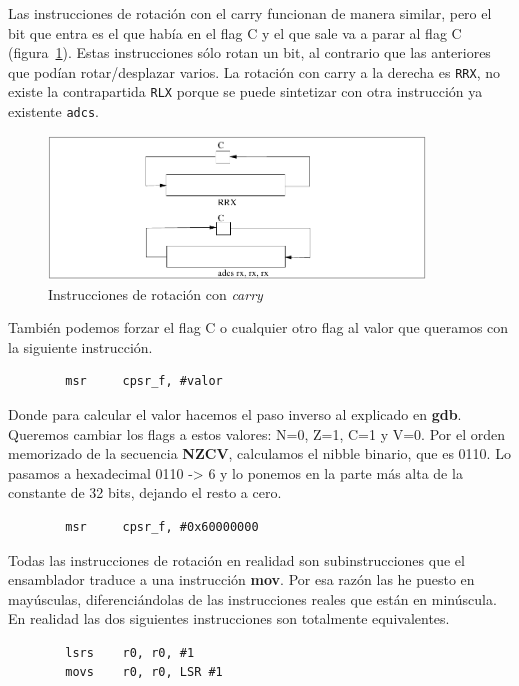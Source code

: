 Las instrucciones de rotación con el carry funcionan de manera
similar, pero el bit que entra es el que había en el flag C y el que sale va a
parar al flag C (figura~\ref{fig:instrRotCarry}). Estas instrucciones
sólo rotan un bit, al contrario que las anteriores que podían rotar/desplazar
varios. La rotación con carry a la derecha es {\tt RRX}, no existe la contrapartida
{\tt RLX} porque se puede sintetizar con otra instrucción ya existente {\tt adcs}.

\begin{figure}[h]
  \centering
    \includegraphics[width=10cm]{graphs/rrxadcs.pdf}
  \caption{Instrucciones de rotación con {\it carry}}
  \label{fig:instrRotCarry}
\end{figure}

También podemos forzar el flag C o cualquier otro flag al
valor que queramos con la siguiente instrucción.

\begin{lstlisting}
        msr     cpsr_f, #valor
\end{lstlisting}

Donde para calcular el valor hacemos el paso inverso al explicado en {\bf gdb}.
Queremos cambiar los flags a estos valores: N=0, Z=1, C=1 y V=0. Por el orden
memorizado de la secuencia {\bf NZCV}, calculamos el nibble binario, que es 0110.
Lo pasamos a hexadecimal 0110 -> 6 y lo ponemos en la parte más alta de la
constante de 32 bits, dejando el resto a cero.

\begin{lstlisting}
        msr     cpsr_f, #0x60000000
\end{lstlisting}

Todas las instrucciones de rotación en realidad son subinstrucciones que el
ensamblador traduce a una instrucción {\bf mov}. Por esa razón las he puesto
en mayúsculas, diferenciándolas de las instrucciones reales que están en
minúscula. En realidad las dos siguientes instrucciones son totalmente
equivalentes.

\begin{lstlisting}
        lsrs    r0, r0, #1
        movs    r0, r0, LSR #1
\end{lstlisting}

